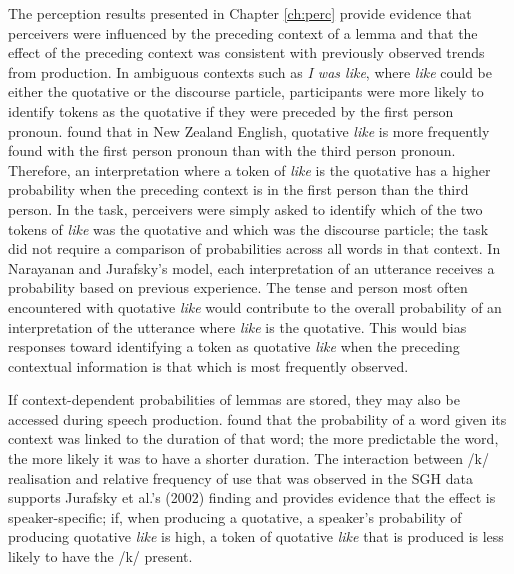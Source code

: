 The perception results presented in Chapter \ref{ch:perc} provide evidence that perceivers were influenced by the preceding context of a lemma and that the effect of the preceding context was consistent with previously observed trends from production.  In ambiguous contexts such as \textit{I was like}, where \textit{like} could be either the quotative or the discourse particle, participants were more likely to identify tokens as the quotative if they were preceded by the first person pronoun.   found that in New Zealand English, quotative \textit{like} is more frequently found with the first person pronoun than with the third person pronoun.  Therefore, an interpretation where a token of \textit{like} is the quotative has a higher probability when the preceding context is in the first person than the third person.  In the task, perceivers were simply asked to identify which of the two tokens of \textit{like} was the quotative and which was the discourse particle; the task did not require a comparison of probabilities across all words in that context.  In Narayanan and Jurafsky's model, each interpretation of an utterance receives a probability based on previous experience.  The tense and person most often encountered with quotative \textit{like} would contribute to the overall probability of an interpretation of the utterance where \textit{like} is the quotative.  This would bias responses toward identifying a token as quotative \textit{like} when the preceding contextual information is that which is most frequently observed.

If context-dependent probabilities of lemmas are stored, they may also be accessed during speech production.   found that the probability of a word given its context was linked to the duration of that word; the more predictable the word, the more likely it was to have a shorter duration.  The interaction between /k/ realisation and relative frequency of use that was observed in the SGH data supports Jurafsky et al.'s (2002) finding and provides evidence that the effect is speaker-specific; if, when producing a quotative, a speaker's probability of producing quotative \textit{like} is high, a token of quotative \textit{like} that is produced is less likely to have the /k/ present.  




